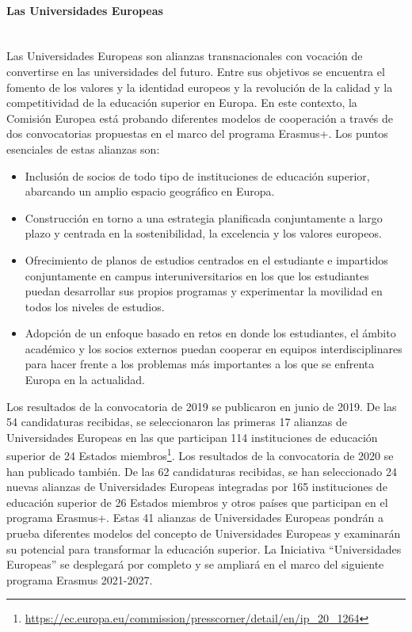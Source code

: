 \paragraph{Las Universidades Europeas\\\\}

Las Universidades Europeas son alianzas transnacionales con vocación de convertirse en las universidades del futuro. Entre sus objetivos se encuentra el fomento de los valores y la identidad europeos y la revolución de la calidad y la competitividad de la educación superior en Europa. En este contexto, la Comisión Europea está probando diferentes modelos de cooperación a través de dos convocatorias propuestas en el marco del programa Erasmus+. Los puntos esenciales de estas alianzas son:

\begin{itemize}
    \item Inclusión de socios de todo tipo de instituciones de educación superior, abarcando un amplio espacio geográfico en Europa.
    \item Construcción en torno a una estrategia planificada conjuntamente a largo plazo y centrada en la sostenibilidad, la excelencia y los valores europeos.
    \item Ofrecimiento de planos de estudios centrados en el estudiante e impartidos conjuntamente en campus interuniversitarios en los que los estudiantes puedan desarrollar sus propios programas y experimentar la movilidad en todos los niveles de estudios.
    \item Adopción de un enfoque basado en retos en donde los estudiantes, el ámbito académico y los socios externos puedan cooperar en equipos interdisciplinares para hacer frente a los problemas más importantes a los que se enfrenta Europa en la actualidad.
\end{itemize}

Los resultados de la convocatoria de 2019 se publicaron en junio de 2019. De las 54 candidaturas recibidas, se seleccionaron las primeras 17 alianzas de Universidades Europeas en las que participan 114 instituciones de educación superior de 24 Estados miembros\footnote{\url{https://ec.europa.eu/commission/presscorner/detail/en/ip_20_1264}}. Los resultados de la convocatoria de 2020 se han publicado también. De las 62 candidaturas recibidas, se han seleccionado 24 nuevas alianzas de Universidades Europeas integradas por 165 instituciones de educación superior de 26 Estados miembros y otros países que participan en el programa Erasmus+. Estas 41 alianzas de Universidades Europeas pondrán a prueba diferentes modelos del concepto de Universidades Europeas y examinarán su potencial para transformar la educación superior. La Iniciativa ``Universidades Europeas'' se desplegará por completo y se ampliará en el marco del siguiente programa Erasmus 2021-2027.


